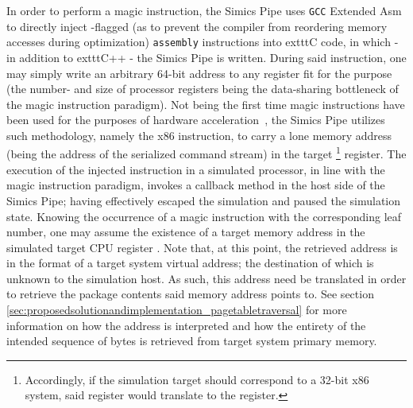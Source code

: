 In order to perform a magic instruction, the Simics Pipe uses \texttt{GCC} Extended Asm to directly inject -flagged (as to prevent the compiler from reordering memory accesses during optimization) \texttt{assembly} instructions into 	exttt{C} code, in which - in addition to 	exttt{C++} - the Simics Pipe is written.
During said instruction, one may simply write an arbitrary 64-bit address to any register fit for the purpose (the number- and size of processor registers being the data-sharing bottleneck of the magic instruction paradigm).
Not being the first time magic instructions have been used for the purposes of hardware acceleration~, the Simics Pipe utilizes such methodology, namely the  x86 instruction, to carry a lone memory address (being the address of the serialized command stream) in the target \footnote{Accordingly, if the simulation target should correspond to a 32-bit x86 system, said register would translate to the  register.} register.
The execution of the injected instruction in a simulated processor, in line with the magic instruction paradigm, invokes a callback method in the host side of the Simics Pipe; having effectively escaped the simulation and paused the simulation state.
Knowing the occurrence of a magic instruction with the corresponding leaf number, one may assume the existence of a target memory address in the simulated target CPU register .
Note that, at this point, the retrieved address is in the format of a target system virtual address; the destination of which is unknown to the simulation host.
As such, this address need be translated in order to retrieve the package contents said memory address points to.
See section \ref{sec:proposedsolutionandimplementation_pagetabletraversal} for more information on how the address is interpreted and how the entirety of the intended sequence of bytes is retrieved from target system primary memory.

